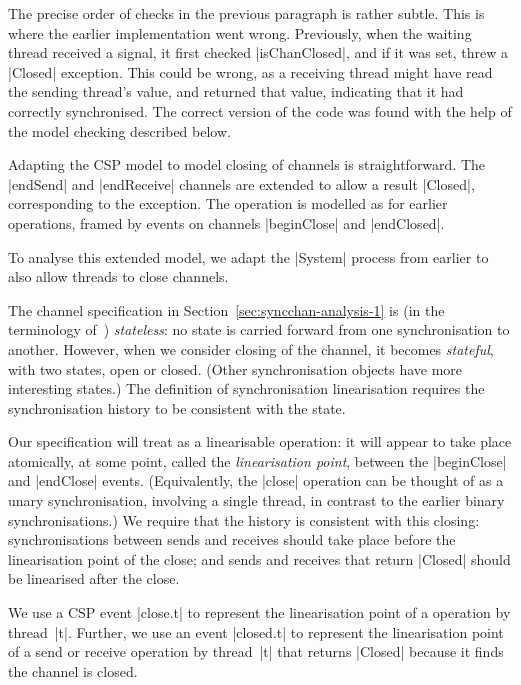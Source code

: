 The precise order of checks in the previous paragraph is rather subtle.  This
is where the earlier implementation went wrong.  Previously, when the waiting
thread received a signal, it first checked |isChanClosed|, and if it was set,
threw a |Closed| exception.  This could be wrong, as a receiving thread might
have read the sending thread's value, and returned that value, indicating that
it had correctly synchronised.  The correct version of the code was found with
the help of the model checking described below. 


\inlineCSP

Adapting the CSP model to model closing of channels is straightforward.  The
|endSend| and |endReceive| channels are extended to allow a result |Closed|,
corresponding to the  exception.  The  operation is
modelled as for earlier operations, framed by events on channels |beginClose|
and |endClosed|.


To analyse this extended model, we adapt the |System| process from earlier to
also allow threads to close channels.  

The channel specification in Section~\ref{sec:syncchan-analysis-1} is (in the
terminology of~\cite{LL:synchronisation}) \emph{stateless}: no state is
carried forward from one synchronisation to another.  However, when we
consider closing of the channel, it becomes \emph{stateful}, with two states,
open or closed.  (Other synchronisation objects have more interesting states.)
The definition of synchronisation linearisation requires the synchronisation
history to be consistent with the state. 

Our specification will treat  as a linearisable operation: it
will appear to take place atomically, at some point, called the
\emph{linearisation point}, between the |beginClose| and |endClose| events.
(Equivalently, the |close| operation can be thought of as a unary
synchronisation, involving a single thread, in contrast to the earlier binary
synchronisations.)  We require that the history is consistent with this
closing: synchronisations between sends and receives should take place before
the linearisation point of the close; and sends and receives that return
|Closed| should be linearised after the close.

We use a CSP event |close.t| to represent the linearisation point of a
 operation by thread~|t|.  Further, we use an event |closed.t| to
represent the linearisation point of a send or receive operation by thread~|t|
that returns |Closed| because it finds the channel is closed.

